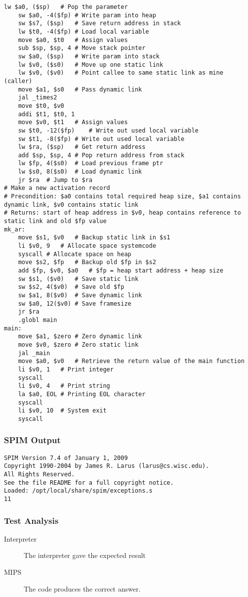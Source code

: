\begin{lstlisting}[showstringspaces=false,breaklines=true,backgroundcolor=\color{light-gray}, captionpos=b]
	lw $a0, ($sp)	# Pop the parameter
	sw $a0, -4($fp)	# Write param into heap
	sw $s7, ($sp)	# Save return address in stack
	lw $t0, -4($fp)	# Load local variable
	move $a0, $t0	# Assign values
	sub $sp, $sp, 4	# Move stack pointer
	sw $a0, ($sp)	# Write param into stack
	lw $v0, ($s0)	# Move up one static link
	lw $v0, ($v0)	# Point callee to same static link as mine (caller)
	move $a1, $s0	# Pass dynamic link
	jal _times2
	move $t0, $v0
	addi $t1, $t0, 1
	move $v0, $t1	# Assign values
	sw $t0, -12($fp)	# Write out used local variable
	sw $t1, -8($fp)	# Write out used local variable
	lw $ra, ($sp)	# Get return address
	add $sp, $sp, 4	# Pop return address from stack
	lw $fp, 4($s0)	# Load previous frame ptr
	lw $s0, 8($s0)	# Load dynamic link
	jr $ra	# Jump to $ra
# Make a new activation record
# Precondition: $a0 contains total required heap size, $a1 contains dynamic link, $v0 contains static link
# Returns: start of heap address in $v0, heap contains reference to static link and old $fp value
mk_ar:
	move $s1, $v0	# Backup static link in $s1
	li $v0, 9	# Allocate space systemcode
	syscall	# Allocate space on heap
	move $s2, $fp	# Backup old $fp in $s2
	add $fp, $v0, $a0	# $fp = heap start address + heap size
	sw $s1, ($v0)	# Save static link
	sw $s2, 4($v0)	# Save old $fp
	sw $a1, 8($v0)	# Save dynamic link
	sw $a0, 12($v0)	# Save framesize
	jr $ra
	.globl main
main:
	move $a1, $zero	# Zero dynamic link
	move $v0, $zero	# Zero static link
	jal _main
	move $a0, $v0	# Retrieve the return value of the main function
	li $v0, 1	# Print integer
	syscall
	li $v0, 4	# Print string
	la $a0, EOL	# Printing EOL character
	syscall
	li $v0, 10	# System exit
	syscall

\end{lstlisting}\subsubsection{SPIM Output}
\begin{verbatim}
SPIM Version 7.4 of January 1, 2009
Copyright 1990-2004 by James R. Larus (larus@cs.wisc.edu).
All Rights Reserved.
See the file README for a full copyright notice.
Loaded: /opt/local/share/spim/exceptions.s
11
\end{verbatim}
\subsubsection{Test Analysis}
\begin{description}
	\item[Interpreter] The interpreter gave the expected result
	\item[MIPS] The code produces the correct answer.
\end{description}